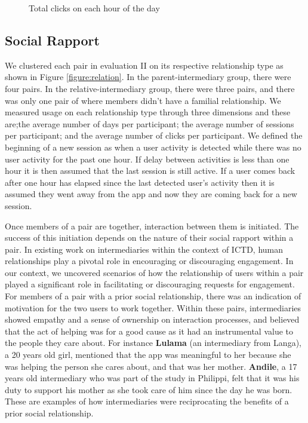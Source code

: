\documentclass{sig-alternate}
\begin{document}
 \begin{figure}
\centering
{}
\caption{Total clicks on each hour of the day}
\label{figure:hourpattern}
\end{figure}
\subsection{Social Rapport}

We clustered each pair in evaluation II on its respective relationship type as
shown in Figure \ref{figure:relation}. In the parent-intermediary group, there
were four pairs. In the relative-intermediary group, there were three pairs,
and there was only one pair of where members didn't have a familial
relationship. We measured usage on each relationship type through three
dimensions and these are;the average number of days per participant; the
average number of sessions per participant; and the average number of clicks
per participant. We defined the beginning of a new session as when a user
activity is detected while there was no user activity for the past one hour.
If delay between activities is less than one hour it is then assumed that the
last session is still active. If a user comes back after one hour has elapsed
since the last detected user's activity then it is assumed they went away from
the app and now they are coming back for a new session.

Once members of a pair are together, interaction between them is initiated.
The success of this initiation depends on the nature of their social rapport
within a pair. In existing work on intermediaries within the context of ICTD,
human relationships play a pivotal role in encouraging or discouraging
engagement. In our context, we uncovered scenarios of how the relationship of
users within a pair played a significant role in facilitating or discouraging
requests for engagement. For members of a pair with a prior social
relationship, there was an indication of motivation for the two users to work
together. Within these pairs, intermediaries showed empathy and a sense of
ownership on interaction processes, and believed that the act of helping was
for a good cause as it had an instrumental value to the people they care
about. For instance \textbf{Lulama} (an intermediary from Langa), a 20 years
old girl, mentioned that the app was meaningful to her because she was helping
the person she cares about, and that was her mother. \textbf{Andile}, a 17
years old intermediary who was part of the study in Philippi, felt that it was
his duty to support his mother as she took care of him since the day he was
born. These are examples of how intermediaries were reciprocating the benefits
of a prior social relationship.
\end{document}
